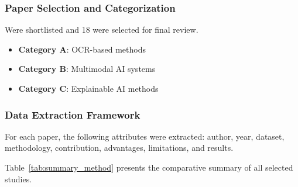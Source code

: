 \documentclass[conference]{IEEEtran}
\begin{document}
\subsubsection{Paper Selection and Categorization}

Were shortlisted and 18 were selected for final review.

\begin{itemize}
    \item \textbf{Category A}: OCR-based methods
    \item \textbf{Category B}: Multimodal AI systems
    \item \textbf{Category C}: Explainable AI methods
\end{itemize}

\subsubsection{Data Extraction Framework}

For each paper, the following attributes were extracted: author, year, dataset, methodology, contribution, advantages, limitations, and results.

Table~\ref{tab:summary_method} presents the comparative summary of all selected studies.
\end{document}
